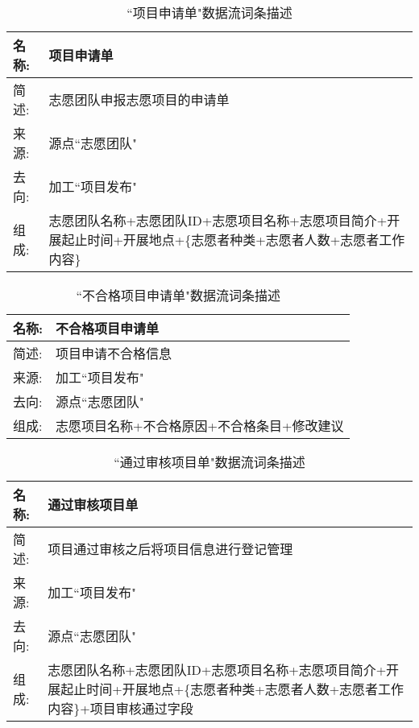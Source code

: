 \begin{table}[H]  
    \caption{``项目申请单"数据流词条描述}  
    \begin{center}  
        \begin{tabular}{l p{11cm}} 
            \hline
            \quad 名称: & 项目申请单 \\
            \hline
            \quad 简述: & 志愿团队申报志愿项目的申请单 \\
            \hline
            \quad 来源: & 源点``志愿团队" \\
            \hline
            \quad 去向: & 加工``项目发布" \\
            \hline
            \quad 组成: & 志愿团队名称+志愿团队ID+志愿项目名称+志愿项目简介+开展起止时间+开展地点+\{志愿者种类+志愿者人数+志愿者工作内容\} \\
            \hline
        \end{tabular}
        \label{tab1}
    \end{center}
    \end{table}


    \begin{table}[H]  
    \caption{``不合格项目申请单"数据流词条描述}  
    \begin{center}  
        \begin{tabular}{l p{11cm}} 
            \hline
            \quad 名称: & 不合格项目申请单 \\
            \hline
            \quad 简述: & 项目申请不合格信息 \\
            \hline
            \quad 来源: & 加工``项目发布" \\
            \hline
            \quad 去向: & 源点``志愿团队" \\
            \hline
            \quad 组成: & 志愿项目名称+不合格原因+{不合格条目+修改建议}  \\
            \hline
        \end{tabular}
        \label{tab1}
    \end{center}
    \end{table}


   \begin{table}[H]  
    \caption{``通过审核项目单"数据流词条描述}  
    \begin{center}  
        \begin{tabular}{l p{11cm}} 
            \hline
            \quad 名称: & 通过审核项目单 \\
            \hline
            \quad 简述: & 项目通过审核之后将项目信息进行登记管理 \\
            \hline
            \quad 来源: & 加工``项目发布" \\
            \hline
            \quad 去向: & 源点``志愿团队" \\
            \hline
            \quad 组成: & 志愿团队名称+志愿团队ID+志愿项目名称+志愿项目简介+开展起止时间+开展地点+\{志愿者种类+志愿者人数+志愿者工作内容\}+项目审核通过字段  \\
            \hline
        \end{tabular}
        \label{tab1}
    \end{center}
    \end{table}